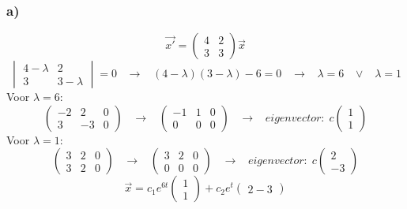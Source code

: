 \documentclass[11pt]{article}
\begin{document}
\subsubsection*{a)}
\[
\vec{x'} = 
\begin{pmatrix}
4 & 2\\
3 & 3
\end{pmatrix}
\vec{x}
\]
\[
\begin{vmatrix}
4-\lambda & 2 \\
3 & 3-\lambda
\end{vmatrix}
=0
\;\;\;\longrightarrow\;\;\;
(4-\lambda)(3-\lambda)-6=0
\;\;\;\longrightarrow\;\;\;
\lambda = 6 \;\;\;\vee\;\;\;\lambda = 1
\]
Voor $\lambda = 6$: 
\[
\left(
\begin{array}{cc|c}
-2 & 2 & 0 \\
3 & -3 & 0
\end{array}
\right)
\;\;\;\longrightarrow\;\;\;
\left(
\begin{array}{cc|c}
-1 & 1 & 0 \\
0 & 0 & 0
\end{array}
\right)
\;\;\;\longrightarrow\;\;\;
eigenvector:\;
c
\begin{pmatrix}
1\\1
\end{pmatrix}
\]
Voor $\lambda = 1$: 
\[
\left(
\begin{array}{cc|c}
3 & 2 & 0 \\
3 & 2 & 0
\end{array}
\right)
\;\;\;\longrightarrow\;\;\;
\left(
\begin{array}{cc|c}
3 & 2 & 0 \\
0 & 0 & 0
\end{array}
\right)
\;\;\;\longrightarrow\;\;\;
eigenvector:\;
c
\begin{pmatrix}
2\\-3
\end{pmatrix}
\]
\[
\vec{x} = c_1e^{6t}\begin{pmatrix}
1\\1
\end{pmatrix}+c_2e^{t}\begin{pmatrix}
2-3
\end{pmatrix}
\]
\end{document}

